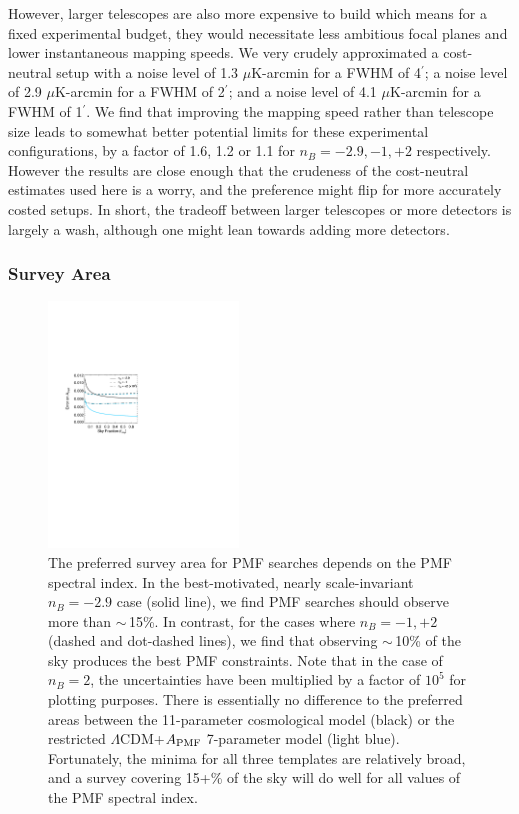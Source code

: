 \documentclass[apj]{emulateapj}
\newcommand{\apmf}{\ensuremath{A_{\rm PMF}}}
\newcommand{\lcdm}{\ensuremath{\Lambda}CDM}
\newcommand{\ukarcmin}{\ensuremath{\mu}{\rm K-arcmin}}
\begin{document}
However, larger telescopes are also more expensive to build which means for a fixed experimental budget, they would necessitate less ambitious focal planes and lower instantaneous mapping speeds. 
We very crudely approximated a cost-neutral setup with a noise level of 1.3 \ukarcmin{} for a FWHM of 4$^\prime$; a noise level of 2.9 \ukarcmin{} for a FWHM of 2$^\prime$; and a noise level of 4.1 \ukarcmin{} for a FWHM of 1$^\prime$. 
We find that 
improving the mapping speed rather than telescope size leads to somewhat better potential limits for these experimental configurations, by a factor of 1.6, 1.2 or 1.1 for $n_B = -2.9, -1, +2$ respectively. 
However the results are close enough that the crudeness of the cost-neutral estimates used here is a worry, and the preference might flip for more accurately costed setups. 
In short,  the tradeoff between larger telescopes or more detectors is largely a wash, although one might lean towards adding more detectors. 

\subsubsection{Survey Area}

\begin{figure}[htb]\centering
\includegraphics[width=0.45\textwidth,clip,trim={2.cm 12.5cm 11cm 7.5cm}]{pmf_area.pdf}
  \caption[Area dependence]{
  The preferred survey area for PMF searches depends on the PMF spectral index. 
    In the best-motivated, nearly scale-invariant $n_B = -2.9$ case (solid line), we find PMF searches should observe more than $\sim$\,15\%. 
 In contrast, for the cases where $n_B = -1, +2$ (dashed and dot-dashed lines), we find that observing  $\sim$\,10\% of the sky produces the best PMF constraints. 
   Note that in the case of $n_B=2$, the uncertainties have been multiplied by a factor of $10^5$ for plotting purposes. 
   There is essentially no difference to the preferred areas between the 11-parameter cosmological model (black) or the restricted \lcdm{}+\apmf{} 7-parameter model (light blue). 
     Fortunately, the minima for all three templates are relatively broad, and a survey covering 15+\% of the sky will do well for all values of the PMF spectral index. 
    \label{fig:area}
  }
\end{figure}
\end{document}
